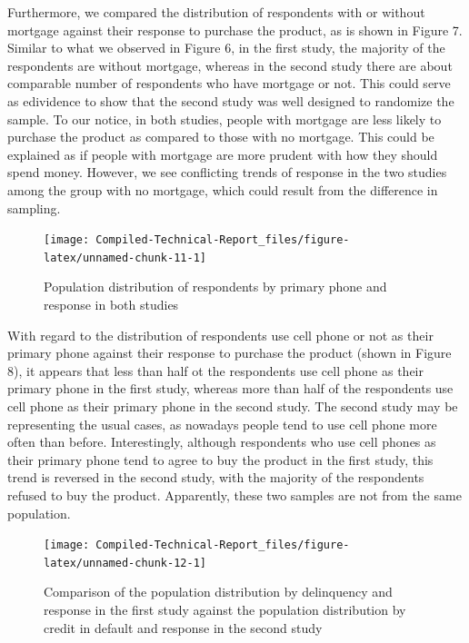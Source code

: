 \documentclass[]{article}
\begin{document}
Furthermore, we compared the distribution of respondents with or without
mortgage against their response to purchase the product, as is shown in
Figure 7. Similar to what we observed in Figure 6, in the first study,
the majority of the respondents are without mortgage, whereas in the
second study there are about comparable number of respondents who have
mortgage or not. This could serve as edividence to show that the second
study was well designed to randomize the sample. To our notice, in both
studies, people with mortgage are less likely to purchase the product as
compared to those with no mortgage. This could be explained as if people
with mortgage are more prudent with how they should spend money.
However, we see conflicting trends of response in the two studies among
the group with no mortgage, which could result from the difference in
sampling.

\begin{figure}

{\centering \texttt{[image: Compiled-Technical-Report\_files/figure-latex/unnamed-chunk-11-1]} 

}

\caption{Population distribution of respondents by primary phone and response in both studies}\label{fig:unnamed-chunk-11}
\end{figure}

With regard to the distribution of respondents use cell phone or not as
their primary phone against their response to purchase the product
(shown in Figure 8), it appears that less than half ot the respondents
use cell phone as their primary phone in the first study, whereas more
than half of the respondents use cell phone as their primary phone in
the second study. The second study may be representing the usual cases,
as nowadays people tend to use cell phone more often than before.
Interestingly, although respondents who use cell phones as their primary
phone tend to agree to buy the product in the first study, this trend is
reversed in the second study, with the majority of the respondents
refused to buy the product. Apparently, these two samples are not from
the same population.

\begin{figure}

{\centering \texttt{[image: Compiled-Technical-Report\_files/figure-latex/unnamed-chunk-12-1]} 

}

\caption{Comparison of the population distribution by delinquency and response in the first study against the population distribution by credit in default and response in the second study}\label{fig:unnamed-chunk-12}
\end{figure}
\end{document}
